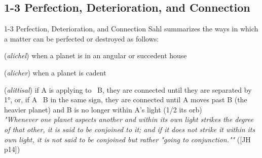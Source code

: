 \subsection{1-3 Perfection, Deterioration, and Connection}
\begin{frame}[t]{1-3 Perfection, Deterioration, and Connection}
Sahl summarizes the ways in which a matter can be perfected or destroyed as follows:\footnotemark[1]

\begin{description}[style=nextline]
\item[1. Perfection or Advance] (\textsl{alichel}) when a planet is in an angular or succedent house

\item[2. Deterioration or Retreat] (\textsl{alicher}) when a planet is cadent

\item[3. Conjunction or Connection] (\textsl{alittisal}) if A is applying to \Conjunction\ B, they are connected until they are separated by 1°, or, if A \Conjunction\ B in the same sign, they are connected until A moves past B (the heavier planet) and B is no longer within A's light (1/2 its orb) \\
\vspace{1em}
\textsl{"Whenever one planet aspects another and within its own light strikes the degree of that other, it is said to be conjoined to it; and if it does not strike it within its own light, it is not said to be conjoined but rather "going to conjunction.""} ([JH p14]) \\

\end{description}

\end{frame}

